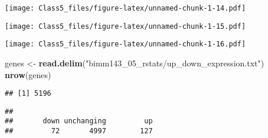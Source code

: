 \documentclass[]{article}
\newenvironment{Shaded}{\begin{snugshade}}{\end{snugshade}}
\newcommand{\DataTypeTok}[1]{\textcolor[rgb]{0.13,0.29,0.53}{#1}}
\newcommand{\DecValTok}[1]{\textcolor[rgb]{0.00,0.00,0.81}{#1}}
\newcommand{\KeywordTok}[1]{\textcolor[rgb]{0.13,0.29,0.53}{\textbf{#1}}}
\newcommand{\NormalTok}[1]{#1}
\newcommand{\OperatorTok}[1]{\textcolor[rgb]{0.81,0.36,0.00}{\textbf{#1}}}
\newcommand{\StringTok}[1]{\textcolor[rgb]{0.31,0.60,0.02}{#1}}
\begin{document}
\texttt{[image: Class5\_files/figure-latex/unnamed-chunk-1-14.pdf]}

\begin{Shaded}
\end{Shaded}

\texttt{[image: Class5\_files/figure-latex/unnamed-chunk-1-15.pdf]}

\begin{Shaded}
\end{Shaded}

\texttt{[image: Class5\_files/figure-latex/unnamed-chunk-1-16.pdf]}

\begin{Shaded}
\begin{Highlighting}[]
\NormalTok{genes <-}\StringTok{ }\KeywordTok{read.delim}\NormalTok{(}\StringTok{"bimm143_05_rstats/up_down_expression.txt"}\NormalTok{)}
\KeywordTok{nrow}\NormalTok{(genes)}
\end{Highlighting}
\end{Shaded}

\begin{verbatim}
## [1] 5196
\end{verbatim}

\begin{Shaded}
\end{Shaded}

\begin{verbatim}
## 
##       down unchanging         up 
##         72       4997        127
\end{verbatim}
\end{document}
